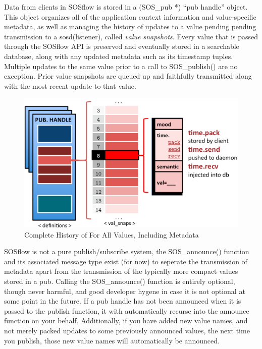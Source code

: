 Data from clients in SOSflow is stored in a (SOS\_pub *) ``pub handle''
object.
%
This object organizes all of the application context information and
value-specific metadata, as well as managing the history of updates to
a value pending pending transmission to a sosd(listener), called
\textit{value snapshots}.
%
Every value that is passed through the SOSflow API is preserved and
eventually stored in a searchable database, along with any updated
metadata such as its timestamp tuples.
%
Multiple updates to the same value prior to a call to SOS\_publish()
are no exception.
%
Prior value snapshots are queued up and faithfully transmitted along
with the most recent update to that value.

\begin{figure}[!t]
\centering
\includegraphics[width=5in]{images/val_snaps.png}
\caption{Complete History of For All Values, Including Metadata}
\label{fig_sim}
\end{figure}

SOSflow is not a pure publish/subscribe system, the SOS\_announce()
function and its associated message type exist (for now) to seperate the
transmission of metadata apart from the transmission of the typically
more compact values stored in a pub.
%
Calling the SOS\_announce() function is entirely optional, though
never harmful, and good developer hygene in case it is not optional at
some point in the future.
%
If a pub handle has not been announced when it is passed to the
publish function, it with automatically recurse into the announce
function on your behalf.
%
Additionally, if you have added new value names, and not merely packed
updates to some previously announced values, the next time you
publish, those new value names will automatically be announced.

